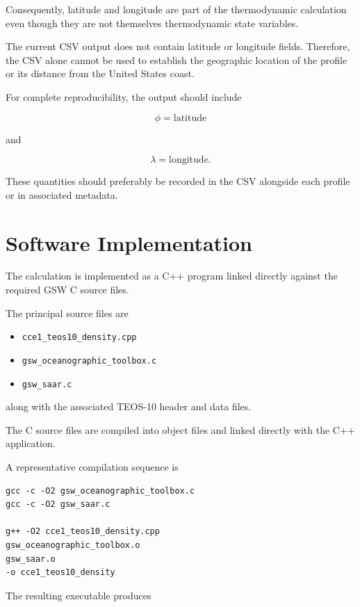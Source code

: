\documentclass[11pt]{article}
\begin{document}
Consequently, latitude and longitude are part of the thermodynamic
calculation even though they are not themselves thermodynamic state
variables.

The current CSV output does not contain latitude or longitude fields.
Therefore, the CSV alone cannot be used to establish the geographic
location of the profile or its distance from the United States coast.

For complete reproducibility, the output should include

\begin{equation}
\phi=\text{latitude}
\end{equation}

and

\begin{equation}
\lambda=\text{longitude}.
\end{equation}

These quantities should preferably be recorded in the CSV alongside
each profile or in associated metadata.

\section{Software Implementation}

The calculation is implemented as a C++ program linked directly
against the required GSW C source files.

The principal source files are

\begin{itemize}
\item \texttt{cce1\_teos10\_density.cpp}
\item \texttt{gsw\_oceanographic\_toolbox.c}
\item \texttt{gsw\_saar.c}
\end{itemize}

along with the associated TEOS-10 header and data files.

The C source files are compiled into object files and linked directly
with the C++ application.

A representative compilation sequence is

\begin{verbatim}
gcc -c -O2 gsw_oceanographic_toolbox.c
gcc -c -O2 gsw_saar.c

g++ -O2 cce1_teos10_density.cpp
gsw_oceanographic_toolbox.o
gsw_saar.o
-o cce1_teos10_density
\end{verbatim}

The resulting executable produces
\end{document}
